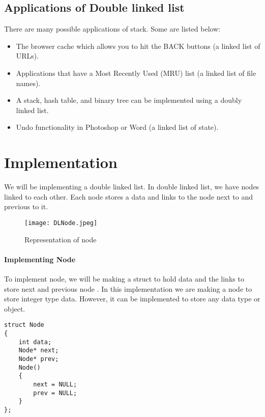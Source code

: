 \documentclass[11pt,fleqn]{book} %
\begin{document}
\subsection{Applications of Double linked list}
There are many possible applications of stack. Some are listed below:
\begin{itemize}
	\item The browser cache which allows you to hit the BACK buttons (a linked list of URLs).
	\item Applications that have a Most Recently Used (MRU) list (a linked list of file names).
	\item A stack, hash table, and binary tree can be implemented using a doubly linked list. 
	\item Undo functionality in Photoshop or Word (a linked list of state).
\end{itemize}

\section{Implementation}
We will be implementing a double linked list. In double linked list, we have nodes linked to each other.
Each node stores a data and links to the node next to and previous to it.
\begin{figure}[H]
	\centering
	\texttt{[image: DLNode.jpeg]}
	\caption{Representation of node}
\end{figure}
\paragraph{Implementing Node}
To implement node, we will be making a struct to hold data and the links to store next and previous node . In this implementation we are making a node to store integer type data. However, it can be implemented to store any data type or object.
\begin{lstlisting}
struct Node
{
	int data;
	Node* next;
	Node* prev;
	Node()
	{
		next = NULL;
		prev = NULL;
	}
};
\end{lstlisting}
\end{document}
